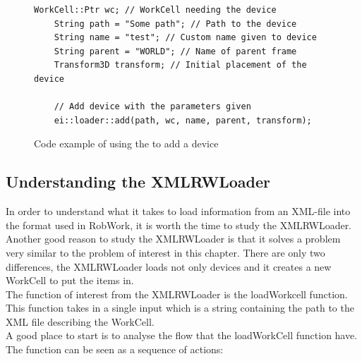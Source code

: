 \begin{figure}[h]
	\centering
	\lstset{language=C++} 
	\begin{lstlisting}[frame=single]
	WorkCell::Ptr wc; // WorkCell needing the device
	String path = "Some path"; // Path to the device
	String name = "test"; // Custom name given to device
	String parent = "WORLD"; // Name of parent frame
	Transform3D transform; // Initial placement of the device
	
	// Add device with the parameters given
	ei::loader::add(path, wc, name, parent, transform);
	\end{lstlisting}
	\caption{Code example of using the to add a device}
	\label{fig:UseCodeExampleLoader}
\end{figure}


\subsection{Understanding the XMLRWLoader}
\label{subsec:XMLRWLoader}
In order to understand what it takes to load information from an XML-file into the format used in RobWork, it is worth the time to study the XMLRWLoader. Another good reason to study the XMLRWLoader is that it solves a problem very similar to the problem of interest in this chapter. There are only two differences, the XMLRWLoader loads not only devices and it creates a new WorkCell to put the items in.\\

The function of interest from the XMLRWLoader is the loadWorkcell function. This function takes in a single input which is a string containing the path to the XML file describing the WorkCell.\\
A good place to start is to analyse the flow that the loadWorkCell function have. The function can be seen as a sequence of actions:

